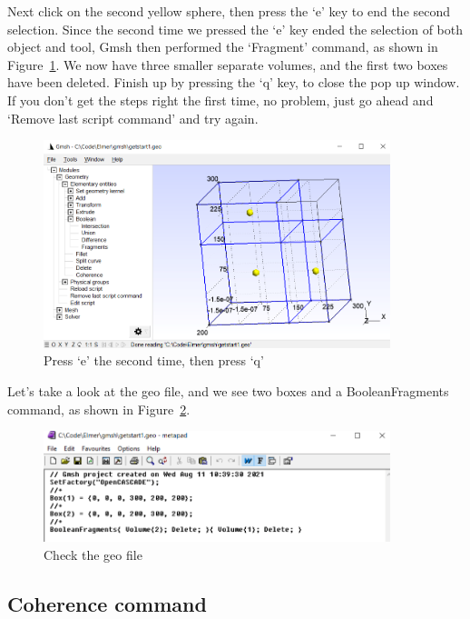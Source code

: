 \newpage

Next click on the second yellow sphere, then press the `e' key to end the second selection.  Since the second time we pressed the `e' key ended the selection of both object and tool, Gmsh then performed the `Fragment' command, as shown in Figure~\ref{fg:gmsh-21}.  We now have three smaller separate volumes, and the first two boxes have been deleted.  Finish up by pressing the `q' key, to close the pop up window.\\

If you don't get the steps right the first time, no problem, just go ahead and `Remove last script command' and try again.

\begin{figure}[H]
\centering
\includegraphics[width=0.9\textwidth]{gmsh-21}
\caption{Press `e' the second time, then press `q'}\label{fg:gmsh-21}
\end{figure}

Let's take a look at the geo file, and we see two boxes and a BooleanFragments command, as shown in Figure~\ref{fg:gmsh-22}.

\begin{figure}[H]
\centering
\includegraphics[width=0.9\textwidth]{gmsh-22}
\caption{Check the geo file}\label{fg:gmsh-22}
\end{figure}

\subsection{Coherence command}

